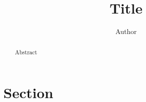 \documentclass[11pt]{article}
\begin{document}
\title{Title}
\author{Author}
\date{}
\maketitle
\begin{abstract}
Abstract
\end{abstract}

\newpage

\tableofcontents

\newpage

\section{Section}
\paragraph{}
\end{document}
